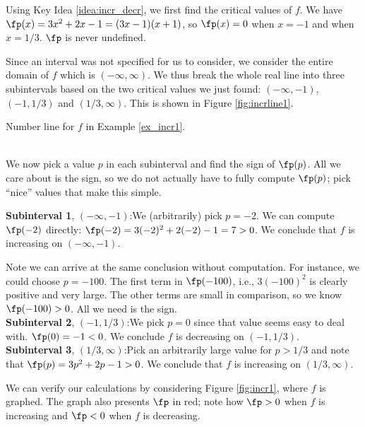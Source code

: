 {Using Key Idea \ref{idea:incr_decr}, we first find the critical values of $f$. We have $\fp(x) = 3x^2+2x-1 = (3x-1)(x+1)$, so $\fp(x) = 0$ when $x=-1$ and when $x=1/3$. $\fp$ is never undefined.

Since an interval was not specified for us to consider, we consider the entire domain of $f$ which is $(-\infty,\infty)$. We thus break the whole real line into three subintervals based on the two critical values we just found: $(-\infty,-1)$, $(-1,1/3)$ and $(1/3,\infty)$. This is shown in Figure \ref{fig:incrline1}.\\

\noindent\begin{minipage}{\textwidth}\centering
{}
\captionsetup{type=figure}%
\caption{Number line for $f$ in Example \ref{ex_incr1}.}\label{fig:incrline1}
\end{minipage}\\

We now pick a value $p$ in each subinterval and find the sign of $\fp(p)$. All we care about is the sign, so we do not actually have to fully compute $\fp(p)$; pick ``nice'' values that make this simple.

\noindent\textbf{Subinterval 1}, $(-\infty,-1)$:\quad We (arbitrarily) pick $p=-2$. We can compute $\fp(-2)$ directly: $\fp(-2) = 3(-2)^2+2(-2)-1=7>0$. We conclude that $f$ is increasing on $(-\infty,-1)$.

Note we can arrive at the same conclusion without computation. For instance, we could choose $p=-100$. The first term in $\fp(-100)$, i.e., $3(-100)^2$ is clearly positive and very large. The other terms are small in comparison, so we know $\fp(-100)>0$. All we need is the sign.\\

\noindent\textbf{Subinterval 2}, $(-1,1/3)$:\quad We pick $p=0$ since that value seems easy to deal with. $\fp(0) = -1<0$. We conclude $f$ is decreasing on $(-1,1/3)$.\\

\noindent\textbf{Subinterval 3}, $(1/3,\infty)$:\quad Pick an arbitrarily large value for $p>1/3$ and note that $\fp(p) =3p^2+2p-1 >0$. We conclude that $f$ is increasing on $(1/3,\infty)$.

We can verify our calculations by considering Figure \ref{fig:incr1}, where $f$ is graphed. The graph also presents $\fp$ in red; note how $\fp>0$ when $f$ is increasing and $\fp<0$ when $f$ is decreasing.
}\\

